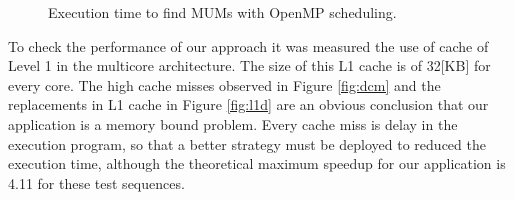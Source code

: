 \documentclass[3p,times]{elsarticle}
\begin{document}
\begin{figure}
  \centering
  \caption{Execution time to find MUMs with OpenMP scheduling.}
  \label{fig:mumtime}
\end{figure}
To check the performance of our approach it was measured the use of cache of Level 1 in the multicore architecture. The size of this L1 cache is of 32[KB] for every core. The high cache misses observed in Figure \ref{fig:dcm} and the replacements in L1 cache in Figure \ref{fig:l1d} are an obvious conclusion that our application is a memory bound problem. Every cache miss is delay in the execution program, so that a better strategy must be deployed to reduced the execution time, although the theoretical maximum speedup for our application is 4.11 for these test sequences.\\
\end{document}
